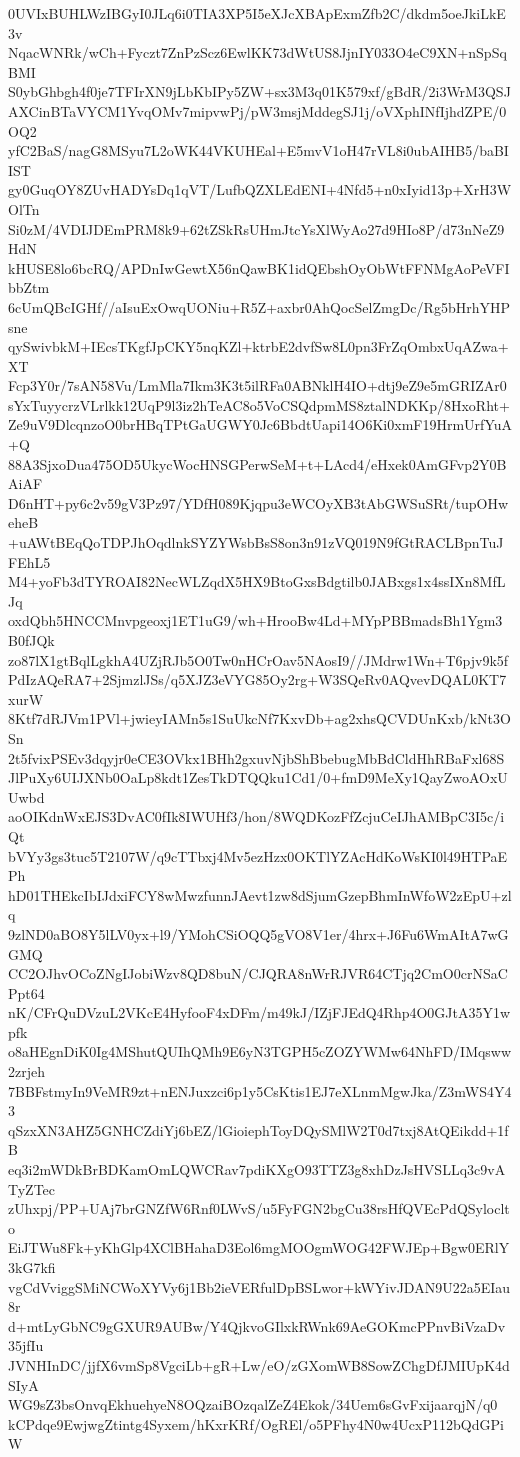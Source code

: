 0UVIxBUHLWzIBGyI0JLq6i0TIA3XP5I5eXJcXBApExmZfb2C/dkdm5oeJkiLkE3v
NqacWNRk/wCh+Fyczt7ZnPzScz6EwlKK73dWtUS8JjnIY033O4eC9XN+nSpSqBMI
S0ybGhbgh4f0je7TFIrXN9jLbKbIPy5ZW+sx3M3q01K579xf/gBdR/2i3WrM3QSJ
AXCinBTaVYCM1YvqOMv7mipvwPj/pW3msjMddegSJ1j/oVXphINfIjhdZPE/0OQ2
yfC2BaS/nagG8MSyu7L2oWK44VKUHEal+E5mvV1oH47rVL8i0ubAIHB5/baBIIST
gy0GuqOY8ZUvHADYsDq1qVT/LufbQZXLEdENI+4Nfd5+n0xIyid13p+XrH3WOlTn
Si0zM/4VDIJDEmPRM8k9+62tZSkRsUHmJtcYsXlWyAo27d9HIo8P/d73nNeZ9HdN
kHUSE8lo6bcRQ/APDnIwGewtX56nQawBK1idQEbshOyObWtFFNMgAoPeVFIbbZtm
6cUmQBcIGHf//aIsuExOwqUONiu+R5Z+axbr0AhQocSelZmgDc/Rg5bHrhYHPsne
qySwivbkM+IEcsTKgfJpCKY5nqKZl+ktrbE2dvfSw8L0pn3FrZqOmbxUqAZwa+XT
Fcp3Y0r/7sAN58Vu/LmMla7Ikm3K3t5ilRFa0ABNklH4IO+dtj9eZ9e5mGRIZAr0
sYxTuyycrzVLrlkk12UqP9l3iz2hTeAC8o5VoCSQdpmMS8ztalNDKKp/8HxoRht+
Ze9uV9DlcqnzoO0brHBqTPtGaUGWY0Jc6BbdtUapi14O6Ki0xmF19HrmUrfYuA+Q
88A3SjxoDua475OD5UkycWocHNSGPerwSeM+t+LAcd4/eHxek0AmGFvp2Y0BAiAF
D6nHT+py6c2v59gV3Pz97/YDfH089Kjqpu3eWCOyXB3tAbGWSuSRt/tupOHweheB
+uAWtBEqQoTDPJhOqdlnkSYZYWsbBsS8on3n91zVQ019N9fGtRACLBpnTuJFEhL5
M4+yoFb3dTYROAI82NecWLZqdX5HX9BtoGxsBdgtilb0JABxgs1x4ssIXn8MfLJq
oxdQbh5HNCCMnvpgeoxj1ET1uG9/wh+HrooBw4Ld+MYpPBBmadsBh1Ygm3B0fJQk
zo87lX1gtBqlLgkhA4UZjRJb5O0Tw0nHCrOav5NAosI9//JMdrw1Wn+T6pjv9k5f
PdIzAQeRA7+2SjmzlJSs/q5XJZ3eVYG85Oy2rg+W3SQeRv0AQvevDQAL0KT7xurW
8Ktf7dRJVm1PVl+jwieyIAMn5s1SuUkcNf7KxvDb+ag2xhsQCVDUnKxb/kNt3OSn
2t5fvixPSEv3dqyjr0eCE3OVkx1BHh2gxuvNjbShBbebugMbBdCldHhRBaFxl68S
JlPuXy6UIJXNb0OaLp8kdt1ZesTkDTQQku1Cd1/0+fmD9MeXy1QayZwoAOxUUwbd
aoOIKdnWxEJS3DvAC0fIk8IWUHf3/hon/8WQDKozFfZcjuCeIJhAMBpC3I5c/iQt
bVYy3gs3tuc5T2107W/q9cTTbxj4Mv5ezHzx0OKTlYZAcHdKoWsKI0l49HTPaEPh
hD01THEkcIbIJdxiFCY8wMwzfunnJAevt1zw8dSjumGzepBhmInWfoW2zEpU+zlq
9zlND0aBO8Y5lLV0yx+l9/YMohCSiOQQ5gVO8V1er/4hrx+J6Fu6WmAItA7wGGMQ
CC2OJhvOCoZNgIJobiWzv8QD8buN/CJQRA8nWrRJVR64CTjq2CmO0crNSaCPpt64
nK/CFrQuDVzuL2VKcE4HyfooF4xDFm/m49kJ/IZjFJEdQ4Rhp4O0GJtA35Y1wpfk
o8aHEgnDiK0Ig4MShutQUIhQMh9E6yN3TGPH5cZOZYWMw64NhFD/IMqsww2zrjeh
7BBFstmyIn9VeMR9zt+nENJuxzci6p1y5CsKtis1EJ7eXLnmMgwJka/Z3mWS4Y43
qSzxXN3AHZ5GNHCZdiYj6bEZ/lGioiephToyDQySMlW2T0d7txj8AtQEikdd+1fB
eq3i2mWDkBrBDKamOmLQWCRav7pdiKXgO93TTZ3g8xhDzJsHVSLLq3c9vATyZTec
zUhxpj/PP+UAj7brGNZfW6Rnf0LWvS/u5FyFGN2bgCu38rsHfQVEcPdQSyloclto
EiJTWu8Fk+yKhGlp4XClBHahaD3Eol6mgMOOgmWOG42FWJEp+Bgw0ERlY3kG7kfi
vgCdVviggSMiNCWoXYVy6j1Bb2ieVERfulDpBSLwor+kWYivJDAN9U22a5EIau8r
d+mtLyGbNC9gGXUR9AUBw/Y4QjkvoGIlxkRWnk69AeGOKmcPPnvBiVzaDv35jfIu
JVNHInDC/jjfX6vmSp8VgciLb+gR+Lw/eO/zGXomWB8SowZChgDfJMIUpK4dSIyA
WG9sZ3bsOnvqEkhuehyeN8OQzaiBOzqalZeZ4Ekok/34Uem6sGvFxijaarqjN/q0
kCPdqe9EwjwgZtintg4Syxem/hKxrKRf/OgREl/o5PFhy4N0w4UcxP112bQdGPiW
